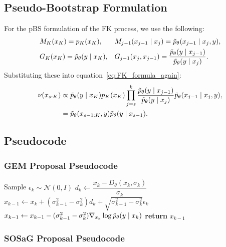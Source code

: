 \subsection{Pseudo-Bootstrap Formulation} \label{app:pBS_explained}
For the pBS formulation of the FK process, we use the following: 
\begin{align}
    &M_K(x_K) = p_K(x_K), &&  M_{j-1}(x_{j-1} \mid x_{j})= \Tilde{p}_{\theta}(x_{j-1} \mid x_{j}, y), \nonumber \\
    &G_K(x_K)= \Tilde{p}_{\theta}(y \mid x_{K}), &&G_{j-1}(x_j, x_{j-1}) = \frac{\Tilde{p}_{\theta}(y \mid x_{j-1})}{\Tilde{p}_{\theta}(y \mid x_{j})}. \nonumber
\end{align}
Substituting these into equation~\ref{eq:FK_formula_again}: 
\begin{align}
    \nu(x_{s:K}) &\propto \Tilde{p}_{\theta}(y \mid x_{K}) p_K(x_K) \prod_{j=s}^k \frac{\Tilde{p}_{\theta}(y \mid x_{j-1})}{\Tilde{p}_{\theta}(y \mid x_{j})}  \Tilde{p}_{\theta}(x_{j-1} \mid x_{j}, y), \\
    &= \Tilde{p}_\theta(x_{s-1:K}, y) \Tilde{p}_{\theta}(y\mid x_{s-1}).
\end{align}

\subsection{Pseudocode} \label{app:pseudocodes}

\subsubsection{GEM Proposal Pseudocode} \label{app:pseudocodes_gem}
\begin{algorithm}[h!]
\caption{GEM Algorithm}
\label{alg:song_proposal}
\begin{algorithmic}[1]
    \STATE Sample $\epsilon_{k} \sim \mathcal{N}(0, I)$
    \STATE $d_{k} \leftarrow \dfrac{x_{k} - D_{\theta}(x_{k}, \sigma_{k})}{\sigma_{k}}$
    \STATE $x_{k-1} \leftarrow x_{k} + (\sigma_{k-1}^2 - \sigma_{k}^2) d_{k} + \sqrt{\sigma_{k-1}^2 - \sigma_{k}^2} \epsilon_{k}$
    \STATE $x_{k-1} \leftarrow x_{k-1} - (\sigma_{k-1}^2 - \sigma_{k}^2) \nabla_{x_{k}}\log \Tilde{p}_\theta(y \mid x_k)$
    \STATE \textbf{return} $x_{k-1}$
\end{algorithmic}
\end{algorithm}

\subsubsection{SOSaG Proposal Pseudocode} \label{app:pseudocodes_sosag}


